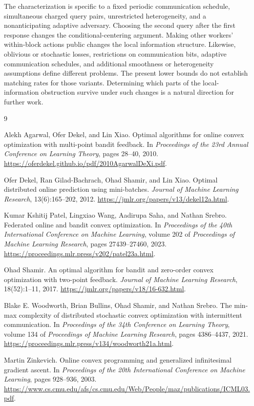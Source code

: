 \documentclass[11pt,a4paper]{article}
\numberwithin{equation}{section}
\theoremstyle{remark}
\begin{document}
The characterization is specific to a fixed periodic communication
schedule, simultaneous charged query pairs, unrestricted heterogeneity,
and a nonanticipating adaptive adversary. Choosing the second query
after the first response changes the conditional-centering argument.
Making other workers' within-block actions public changes the local
information structure. Likewise, oblivious or stochastic losses,
restrictions on communication bits, adaptive communication schedules,
and additional smoothness or heterogeneity assumptions define different
problems. The present lower bounds do not establish matching rates for
those variants. Determining which parts of the local-information
obstruction survive under such changes is a natural direction for
further work.

\begin{thebibliography}{9}

Alekh Agarwal, Ofer Dekel, and Lin Xiao.
\newblock Optimal algorithms for online convex optimization with
multi-point bandit feedback.
\newblock In \emph{Proceedings of the 23rd Annual Conference on Learning
Theory}, pages 28--40, 2010.
\newblock \url{https://oferdekel.github.io/pdf/2010AgarwalDeXi.pdf}.

Ofer Dekel, Ran Gilad-Bachrach, Ohad Shamir, and Lin Xiao.
\newblock Optimal distributed online prediction using mini-batches.
\newblock \emph{Journal of Machine Learning Research}, 13(6):165--202, 2012.
\newblock \url{https://jmlr.org/papers/v13/dekel12a.html}.

Kumar Kshitij Patel, Lingxiao Wang, Aadirupa Saha, and Nathan Srebro.
\newblock Federated online and bandit convex optimization.
\newblock In \emph{Proceedings of the 40th International Conference on
Machine Learning}, volume 202 of \emph{Proceedings of Machine Learning
Research}, pages 27439--27460, 2023.
\newblock \url{https://proceedings.mlr.press/v202/patel23a.html}.

Ohad Shamir.
\newblock An optimal algorithm for bandit and zero-order convex
optimization with two-point feedback.
\newblock \emph{Journal of Machine Learning Research}, 18(52):1--11, 2017.
\newblock \url{https://jmlr.org/papers/v18/16-632.html}.

Blake E. Woodworth, Brian Bullins, Ohad Shamir, and Nathan Srebro.
\newblock The min-max complexity of distributed stochastic convex
optimization with intermittent communication.
\newblock In \emph{Proceedings of the 34th Conference on Learning Theory},
volume 134 of \emph{Proceedings of Machine Learning Research},
pages 4386--4437, 2021.
\newblock \url{https://proceedings.mlr.press/v134/woodworth21a.html}.

Martin Zinkevich.
\newblock Online convex programming and generalized infinitesimal
gradient ascent.
\newblock In \emph{Proceedings of the 20th International Conference on
Machine Learning}, pages 928--936, 2003.
\newblock \url{https://www.cs.cmu.edu/afs/cs.cmu.edu/Web/People/maz/publications/ICML03.pdf}.

\end{thebibliography}
\end{document}
